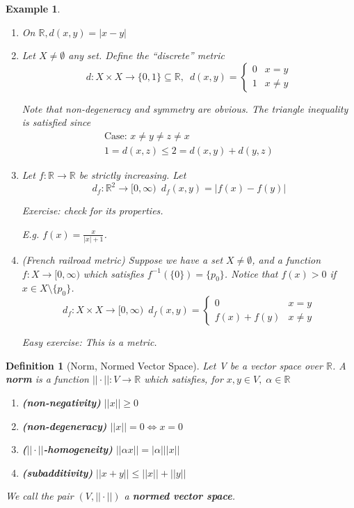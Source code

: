 \documentclass[11pt, oneside]{book}
\theoremstyle{break}
\newtheorem{defn}{Definition}[section]
\newtheorem{eg}{Example}[section]
\newcommand{\bb}[1]{\mathbb{#1}}			%
\begin{document}
\begin{eg}
	\begin{enumerate}
		\item On $\bb{R}, d(x,y) = |x - y|$
		\item Let $X \neq \emptyset$ any set. Define the ``discrete'' metric
			\begin{equation}
				d: X \times X \to \{0, 1\} \subseteq \bb{R}, \enspace d(x,y) =
					\begin{cases}
						0	&	x = y \\
						1	&	x \neq y
					\end{cases}
			\end{equation}

			Note that non-degeneracy and symmetry are obvious. The triangle inequality is satisfied since
			\begin{gather*}
				\text{Case: } x \neq y \neq z \neq x \\
				1 = d(x,z) \leq 2 = d(x,y) + d(y,z)
			\end{gather*}

		\item Let $f: \bb{R} \to \bb{R}$ be strictly increasing. Let
			\begin{equation}
				d_f: \bb{R}^2 \to [0, \infty) \enspace d_f(x,y) = |f(x) - f(y)|
			\end{equation}

			Exercise: check for its properties.

			E.g. $f(x) = \frac{x}{|x| + 1}$.

		\item (French railroad metric) Suppose we have a set $X \neq \emptyset$, and a function $f: X \to [0, \infty)$ which satisfies $f^{-1}(\{0\}) = \{p_0\}$. Notice that $f(x) > 0$ if $x \in X \setminus \{p_0\}$.
			\begin{equation}
				d_f: X \times X \to [0, \infty) \enspace d_f (x, y) = 
				\begin{cases}
					0  &  x = y \\
					f(x) + f(y)  &  x \neq y
				\end{cases}
			\end{equation}

			Easy exercise: This is a metric.
	\end{enumerate}
\end{eg}

\begin{defn}[Norm, Normed Vector Space]
	Let V be a vector space over $\bb{R}$. A \textbf{norm} is a function $||\cdot|| : V \to \bb{R}$ which satisfies, for $x, y \in V, \; \alpha \in \bb{R}$
	\begin{enumerate}
		\item \textbf{(non-negativity)} $||x|| \geq 0$
		\item \textbf{(non-degeneracy)} $||x|| = 0 \iff x = 0$
		\item \textbf{($||\cdot||$-homogeneity)} $||\alpha x|| = |\alpha|||x||$
		\item \textbf{(subadditivity)} $||x + y|| \leq ||x|| + ||y||$
	\end{enumerate}
	We call the pair $(V, ||\cdot||)$ a \textbf{normed vector space}.
\end{defn}
\end{document}
